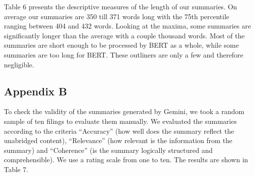 \documentclass[
]{article}
\begin{document}
Table 6 presents the descriptive measures of the length of our
summaries. On average our summaries are 350 till 371 words long with the
75th percentile ranging between 404 and 432 words. Looking at the
maxima, some summaries are significantly longer than the average with a
couple thousand words. Most of the summaries are short enough to be
processed by BERT as a whole, while some summaries are too long for
BERT. These outliners are only a few and therefore negligible.

\begin{table}[H]
\centering
\caption{Descriptive Statistics of Number of Words of our Summaries}
\centering
{}
\end{table}

\subsection{Appendix B}\label{appendix-b}

To check the validity of the summaries generated by Gemini, we took a
random sample of ten filings to evaluate them manually. We evaluated the
summaries according to the criteria ``Accuracy'' (how well does the
summary reflect the unabridged content), ``Relevance'' (how relevant is
the information from the summary) and ``Coherence'' (is the summary
logically structured and comprehensible). We use a rating scale from one
to ten. The results are shown in Table 7.
\end{document}
